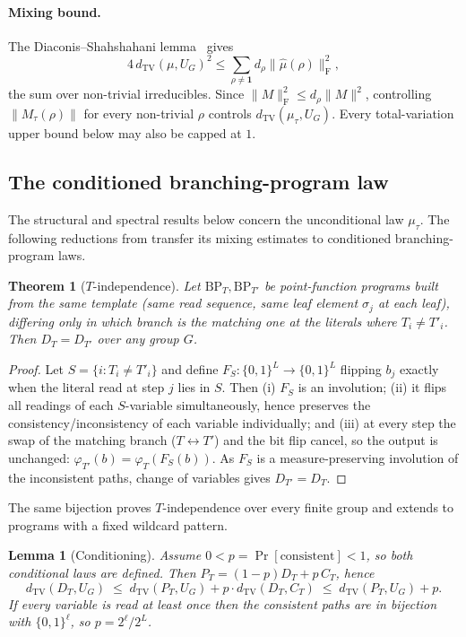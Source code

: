 \documentclass[11pt]{amsart}
\newtheorem{theorem}{Theorem}[section]
\newtheorem{lemma}[lemma]{Lemma}
\theoremstyle{definition}
\theoremstyle{remark}
\theoremstyle{plain}
\theoremstyle{plain}
\numberwithin{equation}{section}
\newcommand{\norm}[1]{\lVert #1 \rVert}
\newcommand{\frob}[1]{\norm{#1}_{\mathrm{F}}}
\newcommand{\opn}[1]{\norm{#1}}
\newcommand{\dtv}{d_{\mathrm{TV}}}
\newcommand{\BP}{\mathrm{BP}}
\begin{document}
\paragraph{Mixing bound.}
The Diaconis--Shahshahani lemma~\cite{DS81} gives
\[
4\,\dtv(\mu,U_G)^2\le\sum_{\rho\neq\mathbf 1}d_\rho\frob{\widehat\mu(\rho)}^2,
\]
the sum over non-trivial irreducibles. Since $\frob{M}^2\le d_\rho\opn{M}^2$,
controlling $\opn{M_\tau(\rho)}$ for every non-trivial $\rho$ controls
$\dtv(\mu_\tau,U_G)$. Every total-variation upper bound below may also
be capped at $1$.

\subsection{The conditioned branching-program law}
\label{sec:tindep}
\label{sec:conditioning}

The structural and spectral results below concern the unconditional
law $\mu_\tau$. The following reductions from
\cite[Theorem~3 and Lemma~1]{ZermenoS5} transfer its mixing estimates
to conditioned branching-program laws.

\begin{theorem}[$T$-independence]
\label{thm:tindep}
Let $\BP_T,\BP_{T'}$ be point-function programs built from the same template (same read
sequence, same leaf element $\sigma_j$ at each leaf), differing only in which branch is
the matching one at the literals where $T_i\neq T'_i$. Then $D_T=D_{T'}$ over any group
$G$.
\end{theorem}

\begin{proof}
Let $S=\{i:T_i\neq T'_i\}$ and define $F_S:\{0,1\}^L\to\{0,1\}^L$ flipping $b_j$ exactly
when the literal read at step $j$ lies in $S$. Then (i) $F_S$ is an involution; (ii) it
flips all readings of each $S$-variable simultaneously, hence preserves the
consistency/inconsistency of each variable individually; and (iii) at every step the
swap of the matching branch ($T\!\leftrightarrow\!T'$) and the bit flip cancel, so the
output is unchanged: $\varphi_{T'}(b)=\varphi_T(F_S(b))$. As $F_S$ is a measure-preserving
involution of the inconsistent paths, change of variables gives $D_{T'}=D_T$.
\end{proof}

The same bijection proves $T$-independence over every finite group and
extends to programs with a fixed wildcard pattern.

\begin{lemma}[Conditioning]
\label{lem:conditioning}
Assume $0<p=\Pr[\text{consistent}]<1$, so both conditional laws are defined. Then $P_T=(1-p)D_T+p\,C_T$, hence
\[
\dtv(D_T,U_G)\;\le\;\dtv(P_T,U_G)+p\cdot\dtv(D_T,C_T)\;\le\;\dtv(P_T,U_G)+p .
\]
If every variable is read at least once then the consistent paths are in bijection with
$\{0,1\}^\ell$, so $p=2^\ell/2^L$.
\end{lemma}
\end{document}
